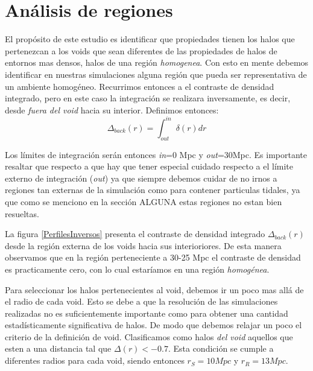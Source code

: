 \section{An\'alisis de regiones}


El prop\'osito de este estudio es identificar que propiedades tienen los halos que pertenezcan a los voids que sean diferentes de las propiedades de halos de entornos mas densos, halos de una regi\'on \textit{homogenea}. Con  esto en mente debemos identificar en nuestras simulaciones alguna regi\'on que pueda ser representativa de un ambiente homog\'eneo. Recurrimos entonces a el contraste de densidad integrado, pero en este caso la integraci\'on se realizara inversamente, es decir, desde \textit{fuera del void} hacia su interior. Definimos entonces:
\begin{equation}
    \Delta_{back}(r)=\int^{in}_{out}\delta(r)dr
\end{equation}{}

Los l\'imites de integraci\'on ser\'an entonces \textit{in}=0 Mpc y \textit{out}=30Mpc. Es importante resaltar que respecto a que hay que tener especial cuidado respecto a el l\'imite externo de integraci\'on (\textit{out}) ya que siempre debemos cuidar de no irnos a regiones tan externas de la simulaci\'on como para contener particulas tidales, ya que como se menciono en la secci\'on ALGUNA estas regiones no estan bien resueltas.

La figura \ref{PerfilesInversos} presenta el contraste de densidad integrado $\Delta_{back}(r)$ desde la regi\'on externa de los voids hacia sus interioriores. De esta manera observamos que en la regi\'on perteneciente a 30-25 Mpc el contraste de densidad es practicamente cero, con lo cual estar\'iamos en una regi\'on \textit{homog\'enea}.

Para seleccionar los halos pertenecientes al void, debemos ir un poco mas all\'a de el radio de cada void. Esto se debe a que la resoluci\'on de las simulaciones realizadas no es suficientemente importante como para obtener una cantidad estad\'isticamente significativa de halos. De modo que debemos relajar un poco el criterio de la definici\'on de void. Clasificamos como halos \textit{del void} aquellos que esten a una distancia tal que $\Delta(r)<-0.7$. Esta condici\'on se cumple a diferentes radios para cada void, siendo entonces $r_{S}=10 Mpc$ y $r_{R}=13 Mpc$.



